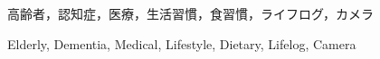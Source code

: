 \documentclass[../report]{subfiles}
\begin{document}
\begin{jabstract}
\begin{jkeyword}
高齢者，認知症，医療，生活習慣，食習慣，ライフログ，カメラ
\end{jkeyword}
\end{jabstract}

\begin{eabstract}
\begin{ekeyword}
Elderly, Dementia, Medical, Lifestyle, Dietary, Lifelog, Camera
\end{ekeyword}
\end{eabstract}
\end{document}
